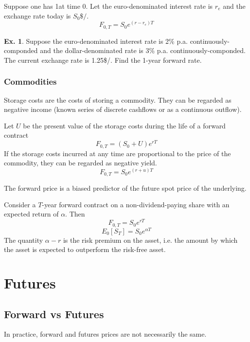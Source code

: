 \documentclass[11pt,a4paper]{book}
\theoremstyle{definition}\newtheorem{definition}{Definition}
\theoremstyle{definition}\newtheorem{fact}{Fact}
\theoremstyle{definition}\newtheorem{remark}{Remark}
\theoremstyle{definition}\newtheorem{ex}{Ex.}
\theoremstyle{definition}\newtheorem{project}{Project}
\theoremstyle{definition}\newtheorem{problem}{Problem}
\theoremstyle{definition}\newtheorem{example}{Example}
\numberwithin{theorem}{section}
\numberwithin{corollary}{chapter}
\numberwithin{assumption}{chapter}
\numberwithin{definition}{chapter}
\numberwithin{prop}{chapter}
\numberwithin{notation}{chapter}
\numberwithin{problem}{chapter}
\numberwithin{example}{chapter}
\numberwithin{fact}{chapter}
\numberwithin{ex}{chapter}
\begin{document}
Suppose one has 1\texteuro at time 0. Let the euro-denominated interest rate is $r_e$ and the exchange rate today is $S_0 \$ /$\texteuro.
\begin{equation}
F_{0,T} = S_0 e^{(r-r_e)T}
\end{equation}

\begin{ex}
Suppose the euro-denominated interest rate is 2\% p.a. continuously-componded and the dollar-denominated rate is 3\% p.a. continuously-componded. The current exchange rate is 1.25\$/\texteuro . Find the 1-year forward rate.
\end{ex}

\subsubsection*{Commodities}

Storage costs are the costs of storing a commodity. They can be regarded as negative income (known series of discrete cashflows or as a continuous outflow).

Let $U$ be the present value of the storage costs during the life of a forward contract
\begin{equation}
F_{0,T} = (S_0 + U)e^{rT}
\end{equation}
If the storage costs incurred at any time are proportional to the price of the commodity, they can be regarded as negative yield.
\begin{equation}
F_{0,T} = S_0 e^{(r+u)T}
\end{equation}

The forward price is a biased predictor of the future spot price of the underlying.

Consider a $T$-year forward contract on a non-dividend-paying share with an expected return of $\alpha$. Then
$$ F_{0,T} = S_0 e^{rT} $$
$$ E_0[S_T] = S_0 e^{\alpha T} $$
The quantity $\alpha - r$ is the risk premium on the asset, i.e. the amount by which the asset is expected to outperform the risk-free asset.

\section{Futures}

\subsection{Forward vs Futures}
In practice, forward and futures prices are not necessarily the same.
\end{document}
